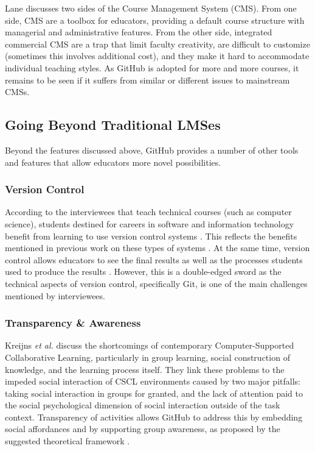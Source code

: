 Lane \cite{lane2008toolbox} discusses two sides of the Course Management System (CMS). From one side, CMS are a toolbox for educators, providing a default course structure with managerial and administrative features. From the other side, integrated commercial CMS are a trap that limit faculty creativity, are difficult to customize (sometimes this involves additional cost), and they make it hard to accommodate individual teaching styles. As GitHub is adopted for more and more courses, it remains to be seen if it suffers from similar or different issues to mainstream CMSs.

\subsection{Going Beyond Traditional LMSes}
Beyond the features discussed above, GitHub provides a number of other tools and features that allow educators more novel possibilities.

\subsubsection{Version Control}
According to the interviewees that teach technical courses (such as computer science), students destined for careers in software and information technology benefit from learning to use version control systems \cite{britton2013using}. This reflects the benefits mentioned in previous work on these types of systems \cite{reid2005learning}. At the same time, version control allows educators to see the final results as well as the processes students used to produce the results \cite{glassy2006using}. However, this is a double-edged sword as the technical aspects of version control, specifically Git, is one of the main challenges mentioned by interviewees.

\subsubsection{Transparency \& Awareness}
Kreijns \textit{et al.} \cite{kreijns2013social} discuss the shortcomings of contemporary Computer-Supported Collaborative Learning, particularly in group learning, social construction of knowledge, and the learning process itself. They link these problems to the impeded social interaction of CSCL environments caused by two major pitfalls: taking social interaction in groups for granted, and the lack of attention paid to the social psychological dimension of social interaction outside of the task context. Transparency of activities allows GitHub to address this by embedding social affordances and by supporting group awareness, as proposed by the suggested theoretical framework \cite{kreijns2002sociability}.

